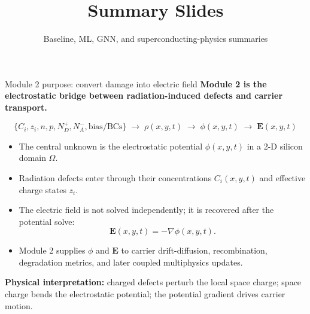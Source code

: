 \documentclass[aspectratio=169,10pt]{beamer}
\title{Summary Slides}
\subtitle{Baseline, ML, GNN, and superconducting-physics summaries}
\author{}
\date{}
\newcommand{\Evec}{\mathbf{E}}
\begin{document}
\begin{frame}{Module 2 purpose: convert damage into electric field}
\small
\textbf{Module 2 is the electrostatic bridge between radiation-induced defects and carrier transport.}

\vspace{0.45em}
\begin{equation*}
\boxed{
\{C_i,z_i,n,p,N_D^+,N_A^-,\text{bias/BCs}\}
\;\longrightarrow\;
\rho(x,y,t)
\;\longrightarrow\;
\phi(x,y,t)
\;\longrightarrow\;
\Evec(x,y,t)
}
\end{equation*}

\vspace{0.35em}
\begin{itemize}
    \item The central unknown is the electrostatic potential $\phi(x,y,t)$ in a 2-D silicon domain $\Omega$.
    \item Radiation defects enter through their concentrations $C_i(x,y,t)$ and effective charge states $z_i$.
    \item The electric field is not solved independently; it is recovered after the potential solve:
    \[
        \Evec(x,y,t)=-\nabla\phi(x,y,t).
    \]
    \item Module 2 supplies $\phi$ and $\Evec$ to carrier drift-diffusion, recombination, degradation metrics, and later coupled multiphysics updates.
\end{itemize}

\vspace{0.25em}
\textbf{Physical interpretation:} charged defects perturb the local space charge; space charge bends the electrostatic potential; the potential gradient drives carrier motion.
\end{frame}
\end{document}
